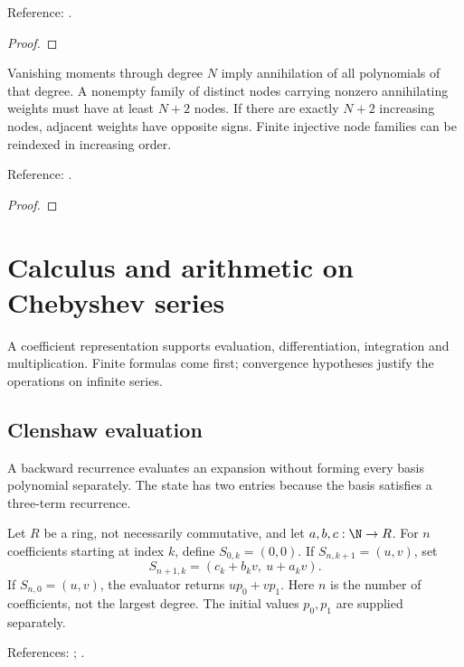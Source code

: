 \begin{supporting}
\begin{theorem}
Reference: \cite[Theorem 10.1]{atap}.
\end{theorem}
\begin{proof}
\leanok
\end{proof}

\begin{theorem}
\label{thm:finite-annihilator-alternation}
\leanok
Vanishing moments through degree $N$ imply annihilation of all polynomials of
that degree. A nonempty family of distinct nodes carrying nonzero annihilating
weights must have at least $N+2$ nodes. If there are exactly $N+2$ increasing
nodes, adjacent weights have opposite signs. Finite injective node families
can be reindexed in increasing order.

Reference: \cite[Theorem 10.1]{atap}.
\end{theorem}
\begin{proof}
\leanok
\end{proof}

\end{supporting}

\chapter{Calculus and arithmetic on Chebyshev series}\label{chap:calculus}


A coefficient representation supports evaluation, differentiation, integration and multiplication. Finite formulas come first; convergence hypotheses justify the operations on infinite series.

\section{Clenshaw evaluation}\label{sec:textbook-calculus-evaluation}

A backward recurrence evaluates an expansion without forming every basis polynomial separately. The state has two entries because the basis satisfies a three-term recurrence.

\begin{definition}
\label{def:clenshaw}
\leanok
Let $R$ be a ring, not necessarily commutative, and let $a,b,c:\N\to R$.
For $n$ coefficients starting at index $k$, define $S_{0,k}=(0,0)$.
If $S_{n,k+1}=(u,v)$, set
\[
 S_{n+1,k}=(c_k+b_kv,\ u+a_kv).
\]
If $S_{n,0}=(u,v)$, the evaluator returns $u p_0+v p_1$.
Here $n$ is the number of coefficients, not the largest degree.
The initial values $p_0,p_1$ are supplied separately.

References: \cite{clenshaw}; \cite[3.11(ii), 18.40(i)]{dlmf}.
\end{definition}

